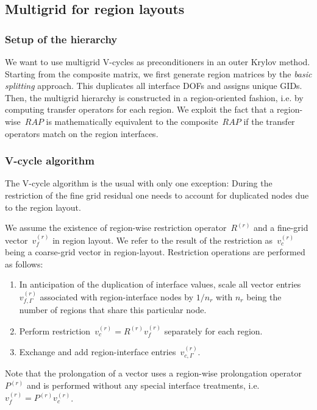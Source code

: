 \documentclass[11pt]{article}
\begin{document}
\subsection{Multigrid for region layouts}

\subsubsection{Setup of the hierarchy}

We want to use multigrid V-cycles as preconditioners in an outer Krylov method. Starting from the composite matrix,
we first generate region matrices by the {\em basic splitting} approach. 
This duplicates all interface DOFs and assigns unique GIDs. 
Then, the multigrid hierarchy is constructed in a region-oriented fashion, i.e. by computing transfer operators for each region. 
We exploit the fact that a region-wise~$RAP$ is mathematically equivalent to the composite~$RAP$ 
if the transfer operators match on the region interfaces.

\subsubsection{V-cycle algorithm}

The V-cycle algorithm is the usual with only one exception: 
During the restriction of the fine grid residual one needs to account for duplicated nodes due to the region layout.

We assume the existence of region-wise restriction operator~$R^{(r)}$ and a fine-grid vector~$v^{(r)}_f$ in region layout. 
We refer to the result of the restriction as~$v^{(r)}_c$ being a coarse-grid vector in region-layout.
Restriction operations are performed as follows:
\begin{enumerate}
\item In anticipation of the duplication of interface values, scale all vector entries~$v^{(r)}_{f,\Gamma}$ 
associated with region-interface nodes by $1/n_r$ with $n_r$ being the number of regions that share this particular node.
\item Perform restriction~$v^{(r)}_c = R^{(r)} v^{(r)}_f$ separately for each region.
\item Exchange and add region-interface entries~$v^{(r)}_{c,\Gamma}$.
\end{enumerate}

Note that the prolongation of a vector uses a region-wise prolongation operator~$P^{(r)}$ 
and is performed without any special interface treatments, i.e. $v^{(r)}_f = P^{(r)}v^{(r)}_c$.
\end{document}
